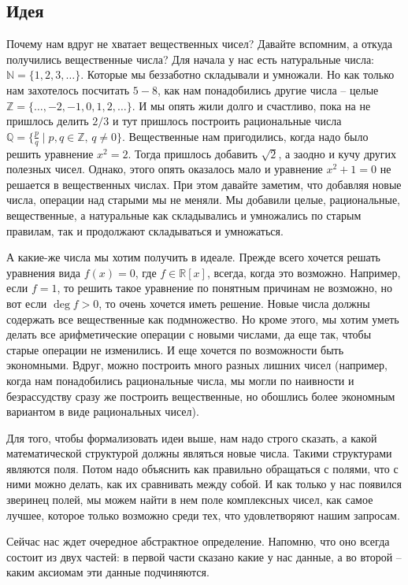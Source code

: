 \subsection{Идея}

Почему нам вдруг не хватает вещественных чисел?
Давайте вспомним, а откуда получились вещественные числа?
Для начала у нас есть натуральные числа: $\mathbb N = \{1,2,3,\ldots\}$.
Которые мы беззаботно складывали и умножали.
Но как только нам захотелось посчитать $5 - 8$, как нам понадобились другие числа -- целые $\mathbb Z = \{\ldots, -2, -1,0,1,2,\ldots\}$.
И мы опять жили долго и счастливо, пока на не пришлось делить $2/3$ и тут пришлось построить рациональные числа $\mathbb Q = \{\frac{p}{q}\mid p,q\in \mathbb Z,\, q\neq 0\}$.
Вещественные нам пригодились, когда надо было решить уравнение $x^2 = 2$.
Тогда пришлось добавить $\sqrt{2}$, а заодно и кучу других полезных чисел.
Однако, этого опять оказалось мало и уравнение $x^2 +1 = 0$ не решается в вещественных числах.
При этом давайте заметим, что добавляя новые числа, операции над старыми мы не меняли.
Мы добавили целые, рациональные, вещественные, а натуральные как складывались и умножались по старым правилам, так и продолжают складываться и умножаться.

А какие-же числа мы хотим получить в идеале.
Прежде всего хочется решать уравнения вида $f(x) = 0$, где $f\in \mathbb R[x]$, всегда, когда это возможно.
Например, если $f = 1$, то решить такое уравнение по понятным причинам не возможно, но вот если $\deg f > 0$, то очень хочется иметь решение.
Новые числа должны содержать все вещественные как подмножество.
Но кроме этого, мы хотим уметь делать все арифметические операции с новыми числами, да еще так, чтобы старые операции не изменились.
И еще хочется по возможности быть экономными.
Вдруг, можно построить много разных лишних чисел (например, когда нам понадобились рациональные числа, мы могли по наивности и безрассудству сразу же построить вещественные, но обошлись более экономным вариантом в виде рациональных чисел).

Для того, чтобы формализовать идеи выше, нам надо строго сказать, а какой математической структурой должны являться новые числа.
Такими структурами являются поля.
Потом надо объяснить как правильно обращаться с полями, что с ними можно делать, как их сравнивать между собой.
И как только у нас появился зверинец полей, мы можем найти в нем поле комплексных чисел, как самое лучшее, которое только возможно среди тех, что удовлетворяют нашим запросам.

Сейчас нас ждет очередное абстрактное определение.
Напомню, что оно всегда состоит из двух частей: в первой части сказано какие у нас данные, а во второй -- каким аксиомам эти данные подчиняются.

